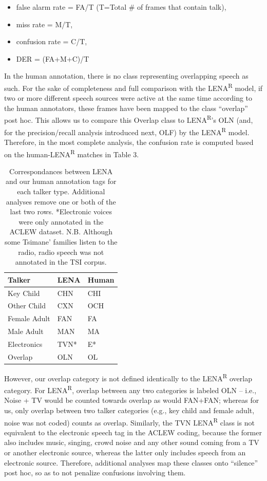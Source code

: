 \documentclass[english,table,man,floatsintext]{apa6}
\providecommand{\tightlist}{%
  \setlength{\itemsep}{0pt}\setlength{\parskip}{0pt}}
\begin{document}
\begin{itemize}
\tightlist
\item
  false alarm rate = FA/T (T=Total \# of frames that contain talk),
\item
  miss rate = M/T,
\item
  confusion rate = C/T,
\item
  DER = (FA+M+C)/T
\end{itemize}

In the human annotation, there is no class representing overlapping speech as such. For the sake of completeness and full comparison with the LENA\textsuperscript{R} model, if two or more different speech sources were active at the same time according to the human annotators, these frames have been mapped to the class \enquote{overlap} post hoc. This allows us to compare this Overlap class to LENA\textsuperscript{R}'s OLN (and, for the precision/recall analysis introduced next, OLF) by the LENA\textsuperscript{R} model. Therefore, in the most complete analysis, the confusion rate is computed based on the human-LENA\textsuperscript{R} matches in Table 3.

\begin{table}[t]

\caption{\label{tab:tab-tsicor}Correspondances between LENA and our human annotation tags for each talker type. Additional analyses remove one or both of the last two rows. *Electronic voices were only annotated in the ACLEW dataset. N.B. Although some Tsimane' families listen to the radio, radio speech was not annotated in the TSI corpus.}
\centering
\begin{tabular}{>{\raggedright\arraybackslash}p{4cm}>{\raggedright\arraybackslash}p{2cm}>{\raggedright\arraybackslash}p{2cm}}
\toprule
Talker & LENA & Human\\
\midrule
Key Child & CHN & CHI\\
Other Child & CXN & OCH\\
Female Adult & FAN & FA\\
Male Adult & MAN & MA\\
Electronics & TVN* & E*\\
\addlinespace
Overlap & OLN & OL\\
\bottomrule
\end{tabular}
\end{table}

However, our overlap category is not defined identically to the LENA\textsuperscript{R} overlap category. For LENA\textsuperscript{R}, overlap between any two categories is labeled OLN -- i.e., Noise + TV would be counted towards overlap as would FAN+FAN; whereas for us, only overlap between two talker categories (e.g., key child and female adult, noise was not coded) counts as overlap. Similarly, the TVN LENA\textsuperscript{R} class is not equivalent to the electronic speech tag in the ACLEW coding, because the former also includes music, singing, crowd noise and any other sound coming from a TV or another electronic source, whereas the latter only includes speech from an electronic source. Therefore, additional analyses map these classes onto \enquote{silence} post hoc, so as to not penalize confusions involving them.
\end{document}
